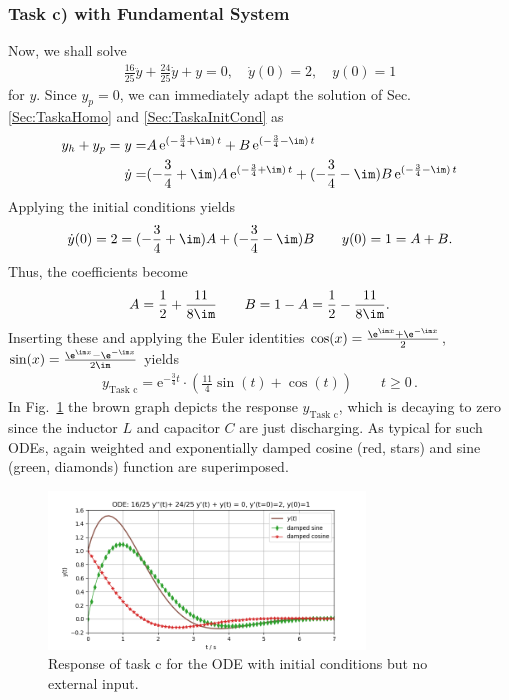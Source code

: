 \subsubsection{Task c) with Fundamental System}
Now, we shall solve
\begin{align}
\frac{16}{25} \ddot{y} + \frac{24}{25} \dot{y} + y = 0,
\quad \dot{y}(0) = 2,\quad y(0)=1
\end{align}
for $y$.
%
Since $y_p=0$, we can immediately adapt the solution of Sec.
\ref{Sec:TaskaHomo} and \ref{Sec:TaskaInitCond} as
%
\begin{align}
y_h + y_p = y =& A \, \mathrm{e}^{(-\frac{3}{4}+\im)\,t} + B \, \mathrm{e}^{(-\frac{3}{4}-\im)\,t}\\
\dot{y} =&
(-\frac{3}{4}+\im) A \, \mathrm{e}^{(-\frac{3}{4}+\im)\,t} +
(-\frac{3}{4}-\im) B \, \mathrm{e}^{(-\frac{3}{4}-\im)\,t}
\end{align}
%
Applying the initial conditions yields
%
\begin{align}
\dot{y}(0) = 2 =
(-\frac{3}{4}+\im) A+
(-\frac{3}{4}-\im) B
\qquad
y(0) = 1 = A + B.
\end{align}
Thus, the coefficients become
\begin{align}
A = \frac{1}{2} + \frac{11}{8\im}\qquad B = 1-A = \frac{1}{2} - \frac{11}{8\im}.
\end{align}
%
Inserting these and applying the Euler identities
$\cos(x) = \frac{\e^{\im x}+\e^{-\im x}}{2}$,
$\sin(x) = \frac{\e^{\im x}-\e^{-\im x}}{2\im}$
yields
\begin{align}
\boxed{
y_\text{Task c} = \mathrm{e}^{-\frac{3}{4} t} \cdot
\left( \frac{11}{4} \sin(t) + \cos(t)\right) \qquad t\geq 0
}\,.
\end{align}
In Fig.~\ref{fig:initial_conditions_response_parts} the brown graph depicts the
response $y_\text{Task c}$, which is decaying to zero since the inductor $L$ and capacitor $C$ are
just discharging. As typical for such ODEs, again
weighted and exponentially damped cosine (red, stars) and sine (green, diamonds)
function are superimposed.

\begin{figure}[h!]
\centering
\includegraphics[width=0.75\textwidth]{../laplace_transform/initial_conditions_response_parts}
\caption{Response of task c for the ODE with initial conditions but no external input.}
\label{fig:initial_conditions_response_parts}
\end{figure}

